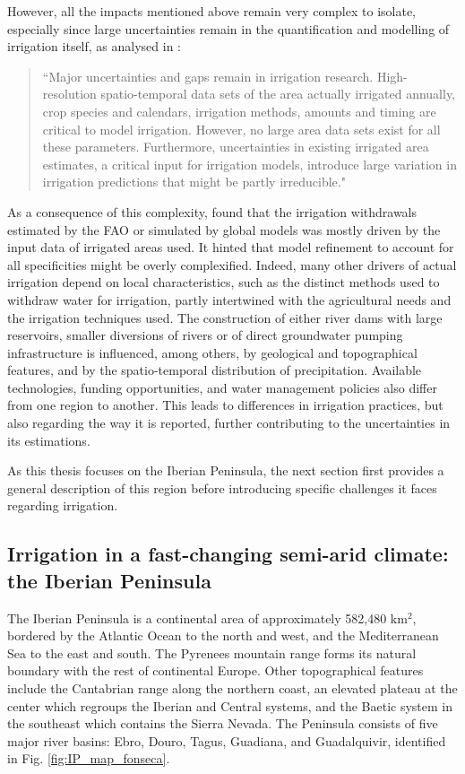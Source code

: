 However, all the impacts mentioned above remain very complex to isolate, especially since large uncertainties remain in the quantification and modelling of irrigation itself, as analysed in \citet{mcdermid_irrigation_2023}:
\begin{quote}
    ``Major uncertainties and gaps remain in irrigation research. High-resolution spatio-temporal data sets of the area actually irrigated annually, crop species and calendars, irrigation methods, amounts and timing are critical to model irrigation. However, no large area data sets exist for all these parameters. Furthermore, uncertainties in existing irrigated area estimates, a critical input for irrigation models, introduce large variation in irrigation predictions that might be partly irreducible."
\end{quote}
As a consequence of this complexity, \citet{puy_irrigated_2021} found that the irrigation withdrawals estimated by the FAO or simulated by global models was mostly driven by the input data of irrigated areas used. It hinted that model refinement to account for all specificities might be overly complexified.
Indeed, many other drivers of actual irrigation depend on local characteristics, such as the distinct methods used to withdraw water for irrigation, partly intertwined with the agricultural needs and the irrigation techniques used. 
The construction of either river dams with large reservoirs, smaller diversions of rivers or of direct groundwater pumping infrastructure is influenced, among others, by geological and topographical features, and by the spatio-temporal distribution of precipitation. Available technologies, funding opportunities, and water management policies also differ from one region to another. This leads to differences in irrigation practices, but also regarding the way it is reported, further contributing to the uncertainties in its estimations.

As this thesis focuses on the Iberian Peninsula, the next section first provides a general description of this region before introducing specific challenges it faces regarding irrigation.

\subsection{Irrigation in a fast-changing semi-arid climate: the Iberian Peninsula}
The Iberian Peninsula is a continental area of approximately 582,480 km$^2$, bordered by the Atlantic Ocean to the north and west, and the Mediterranean Sea to the east and south. The Pyrenees mountain range forms its natural boundary with the rest of continental Europe. Other topographical features include the Cantabrian range along the northern coast, an elevated plateau at the center which regroups the Iberian and Central systems, and the Baetic system in the southeast which contains the Sierra Nevada.
The Peninsula consists of five major river basins: Ebro, Douro, Tagus, Guadiana, and Guadalquivir, identified in Fig. \ref{fig:IP_map_fonseca}.

